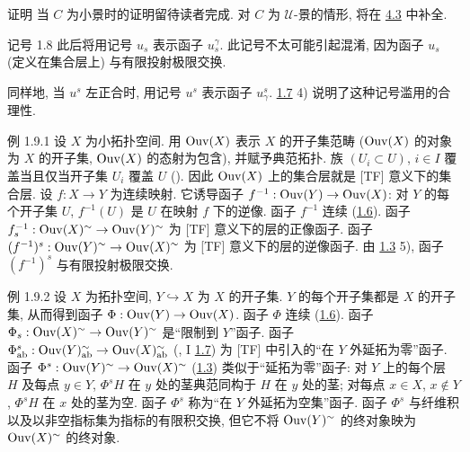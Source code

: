\begin{enonce*}[remark]{证明}
当 $C$ 为小景时的证明留待读者完成.
对 $C$ 为 $𝒰$-景的情形, 将在 \hyperref[III.subsec4.3]{4.3} 中补全.
\end{enonce*}

\begin{enonce*}[remark]{记号 1.8}
此后\pageoriginale{}将用记号 $u_s$ 表示函子 $u^{\gamma}_s$.
此记号不太可能引起混淆, 因为函子 $u_s$ (定义在集合层上) 与有限投射极限交换.
\end{enonce*}

同样地, 当 $u^s$ 左正合时, 用记号 $u^s$ 表示函子 $u^s_{\gamma}$.
\hyperref[III.prop1.7]{1.7} 4) 说明了这种记号滥用的合理性.

\begin{enonce*}[remark]{例 1.9.1}
设 $X$ 为小拓扑空间. 用 $\operatorname{Ouv}(X)$ 表示 $X$ 的开子集范畴
($\operatorname{Ouv}(X)$ 的对象为 $X$ 的开子集, $\operatorname{Ouv}(X)$ 的态射为包含), 并赋予典范拓扑.
族 $(U_i\subset U)$, $i\in I$ 覆盖当且仅当开子集 $U_i$ 覆盖 $U$
(). 因此 $\operatorname{Ouv}(X)$ 上的集合层就是 [TF] 意义下的集合层.
设 $f:X\rightarrow Y$ 为连续映射. 它诱导函子
$f^{-1}:\operatorname{Ouv}(Y)\rightarrow \operatorname{Ouv}(X)$: 对 $Y$ 的每个开子集 $U$,
$f^{-1}(U)$ 是 $U$ 在映射 $f$ 下的逆像.
函子 $f^{-1}$ 连续 (\hyperref[III.prop1.6]{1.6}).
函子 $f^{-1}_s:\operatorname{Ouv}(X)^{\sim}\rightarrow \operatorname{Ouv}(Y)^{\sim}$
为 [TF] 意义下的层的正像函子.
函子 $(f^{-1})^s:\operatorname{Ouv}(Y)^{\sim}\rightarrow \operatorname{Ouv}(X)^{\sim}$
为 [TF] 意义下的层的逆像函子.
由 \hyperref[III.prop1.3]{1.3} 5), 函子 $(f^{-1})^s$ 与有限投射极限交换.
\end{enonce*}

\begin{enonce*}[remark]{例 1.9.2}
设 $X$ 为拓扑空间, $Y\hookrightarrow X$ 为 $X$ 的开子集.
$Y$ 的每个开子集都是 $X$ 的开子集, 从而得到函子
$\Phi:\operatorname{Ouv}(Y)\rightarrow \operatorname{Ouv}(X)$.
函子 $\Phi$ 连续 (\hyperref[III.prop1.6]{1.6}).
函子 $\Phi_s:\operatorname{Ouv}(X)^{\sim}\rightarrow \operatorname{Ouv}(Y)^{\sim}$
是\pageoriginale“限制到 $Y$”函子.
函子 $\Phi^s_{\operatorname{ab}}:\operatorname{Ouv}(Y)^{\sim}_{\operatorname{ab}}\rightarrow \operatorname{Ouv}(X)^{\sim}_{\operatorname{ab}}$
(, I \hyperref[III.prop1.7]{1.7})
为 [TF] 中引入的“在 $Y$ 外延拓为零”函子.
函子 $\Phi^s:\operatorname{Ouv}(Y)^{\sim}\rightarrow \operatorname{Ouv}(X)^{\sim}$
(\hyperref[III.prop1.3]{1.3}) 类似于“延拓为零”函子:
对 $Y$ 上的每个层 $H$ 及每点 $y\in Y$,
$\Phi^sH$ 在 $y$ 处的茎典范同构于 $H$ 在 $y$ 处的茎;
对每点 $x\in X$, $x\not\in Y$, $\Phi^sH$ 在 $x$ 处的茎为空.
函子 $\Phi^s$ 称为“在 $Y$ 外延拓为空集”函子.
函子 $\Phi^s$ 与纤维积以及以非空指标集为指标的有限积交换,
但它不将 $\operatorname{Ouv}(Y)^{\sim}$ 的终对象映为 $\operatorname{Ouv}(X)^{\sim}$ 的终对象.
\end{enonce*}

